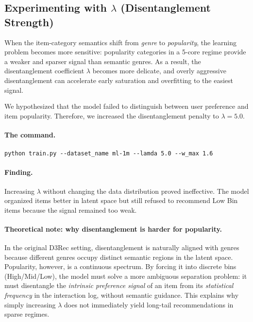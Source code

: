 \documentclass[11pt,a4paper]{article}
\begin{document}
\subsection{Experimenting with $\lambda$ (Disentanglement Strength)}
When the item-category semantics shift from \emph{genre} to \emph{popularity}, the learning problem becomes more sensitive: popularity categories in a 5-core regime provide a weaker and sparser signal than semantic genres. As a result, the disentanglement coefficient $\lambda$ becomes more delicate, and overly aggressive disentanglement can accelerate early saturation and overfitting to the easiest signal.

We hypothesized that the model failed to distinguish between user preference and item popularity. Therefore, we increased the disentanglement penalty to $\lambda=5.0$.

\paragraph{The command.}
\begin{lstlisting}[style=bash]
python train.py --dataset_name ml-1m --lamda 5.0 --w_max 1.6
\end{lstlisting}

\paragraph{Finding.}
Increasing $\lambda$ without changing the data distribution proved ineffective. The model organized items better in latent space but still refused to recommend Low Bin items because the signal remained too weak.

\paragraph{Theoretical note: why disentanglement is harder for popularity.}
In the original D3Rec setting, disentanglement is naturally aligned with genres because different genres occupy distinct semantic regions in the latent space. Popularity, however, is a continuous spectrum. By forcing it into discrete bins (High/Mid/Low), the model must solve a more ambiguous separation problem: it must disentangle the \emph{intrinsic preference signal} of an item from its \emph{statistical frequency} in the interaction log, without semantic guidance. This explains why simply increasing $\lambda$ does not immediately yield long-tail recommendations in sparse regimes.
\end{document}
